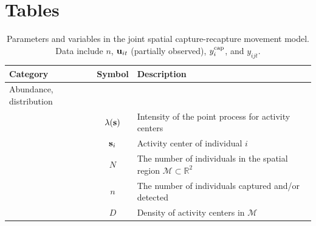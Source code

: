 \documentclass[12pt]{article}
\newcommand{\bs}{{\bf s}}
\newcommand{\bsi}{{\bf s}_i}
\newcommand{\buit}{{\bf u}_{it}}
\begin{document}



\clearpage

\section*{Tables}


\begin{table}[h!]
  \caption{Parameters and variables in the joint spatial
    capture-recapture movement model. Data include $n$, $\buit$
    (partially observed), $y_i^{\rm cap}$, and $y_{ijt}$.}
  \begin{tabular}{p{3.5cm}cp{11cm}}
    \hline
    Category & Symbol & Description \\
    \hline
    Abundance, distribution & & \\
                          & $\lambda(\bs)$ & Intensity of the point process for activity centers \\
                          & $\bsi$              & Activity center of individual $i$  \\
                          & $N$                 & The number of individuals in the spatial region $\mathcal M \subset \mathbb{R}^2$ \\
                          & $n$                 & The number of individuals captured and/or detected \\
                          & $D$    & Density of activity centers in $\mathcal M$ \\
    

\end{tabular}
\end{table}
\end{document}
